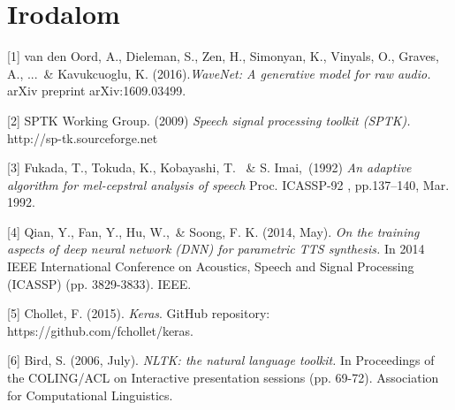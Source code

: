 \section*{Irodalom}



\small


\label{ref_1}[1] van den Oord, A., Dieleman, S., Zen, H., Simonyan, K., Vinyals, O., Graves, A., ...\ \& Kavukcuoglu, K. (2016).{\it WaveNet: A generative model for raw audio.} arXiv preprint arXiv:1609.03499.

\label{ref_2}[2] SPTK Working Group. (2009) {\it Speech signal processing toolkit (SPTK).} http://sp-tk.sourceforge.net

\label{ref_3}[3] Fukada, T., Tokuda, K., Kobayashi, T. \ \& S. Imai,\ (1992) {\it An adaptive algorithm for mel-cepstral 
analysis of speech} Proc. ICASSP-92 , pp.137–140, Mar. 1992.

\label{ref_4}[4] Qian, Y., Fan, Y., Hu, W.,\ \& Soong, F. K. (2014, May). {\it On the training aspects of deep neural network (DNN) for parametric TTS synthesis.} In 2014 IEEE International Conference on Acoustics, Speech and Signal Processing (ICASSP) (pp. 3829-3833). IEEE.

\label{ref_5}[5] Chollet, F. (2015). {\it Keras}. GitHub repository: https://github.com/fchollet/keras.

\label{ref_6}[6] Bird, S. (2006, July). {\it NLTK: the natural language toolkit.} In Proceedings of the COLING/ACL on Interactive presentation sessions (pp. 69-72). Association for Computational Linguistics.
